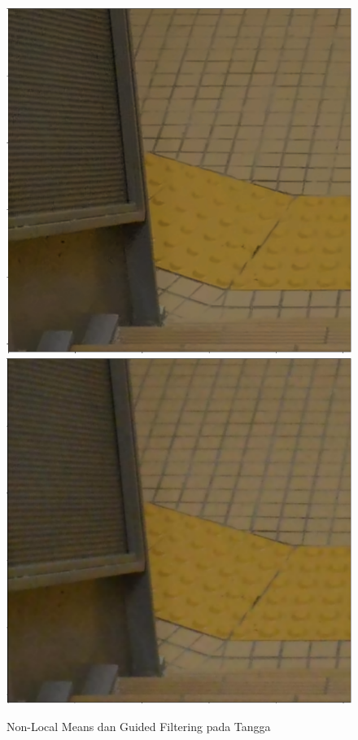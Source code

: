\documentclass[11pt, a4paper, final]{report}
\begin{document}
\begin{figure}[H]
\centering
\includegraphics[scale=0.4]{assets/TanggaNLMeans.png}
\includegraphics[scale=0.4]{assets/TanggaGuided.png}
\caption{Non-Local Means dan Guided Filtering pada Tangga}
\end{figure}
\end{document}
